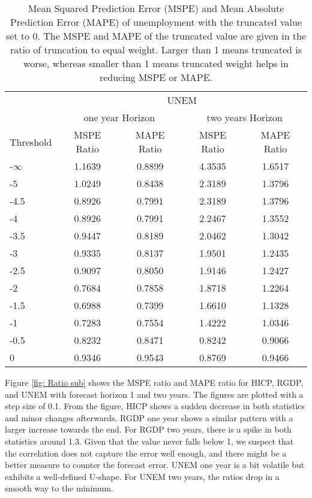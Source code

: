 \documentclass[11pt]{article}
\begin{document}
\begin{table}[!h] 
	\centering
	\caption{Mean Squared Prediction Error (MSPE) and Mean Absolute Prediction Error (MAPE) of unemployment with the truncated value set to 0. The MSPE and MAPE of the truncated value are given in the ratio of truncation to equal weight. Larger than 1 means truncated is worse, whereas smaller than 1 means truncated weight helps in reducing MSPE or MAPE.}
	\label{tab: MSPE UNEM}
	\begin{tabular}{lcccc}
		\hline\hline
		& \multicolumn{4}{c}{UNEM}                                                \\
		\cmidrule(lr){2-5}
		& \multicolumn{2}{c}{one year Horizon} & \multicolumn{2}{c}{two years Horizon} \\
		\cmidrule(lr){2-3} \cmidrule(lr){4-5}
		Threshold & MSPE Ratio &    MAPE Ratio    & MSPE Ratio &    MAPE Ratio    \\ 
		\hline
		-$\infty$ & 1.1639 & 0.8899 & 4.3535 & 1.6517\\ 
		-5 & 1.0249 & 0.8438 & 2.3189 & 1.3796\\ 
		-4.5 & 0.8926 & 0.7991 & 2.3189 & 1.3796\\ 
		-4 & 0.8926 & 0.7991 & 2.2467 & 1.3552\\ 
		-3.5 & 0.9447 & 0.8189 & 2.0462 & 1.3042\\ 
		-3 & 0.9335 & 0.8137 & 1.9501 & 1.2435\\ 
		-2.5 & 0.9097 & 0.8050 & 1.9146 & 1.2427\\ 
		-2 & 0.7684 & 0.7858 & 1.8718 & 1.2264\\ 
		-1.5 & 0.6988 & 0.7399 & 1.6610 & 1.1328\\ 
		-1 & 0.7283 & 0.7554 & 1.4222 & 1.0346\\ 
		-0.5 & 0.8232 & 0.8471 & 0.8242 & 0.9066\\ 
		0 & 0.9346 & 0.9543 & 0.8769 & 0.9466\\ \hline\hline
	\end{tabular}
\end{table}


Figure \ref{fig: Ratio sub} shows the MSPE ratio and MAPE ratio for HICP, RGDP, and UNEM with forecast horizon 1 and two years. The figures are plotted with a step size of 0.1. From the figure, HICP shows a sudden decrease in both statistics and minor changes afterwards. RGDP one year shows a similar pattern with a larger increase towards the end. For RGDP two years, there is a spike in both statistics around 1.3. Given that the value never falls below 1, we suspect that the correlation does not capture the error well enough, and there might be a better measure to counter the forecast error. UNEM one year is a bit volatile but exhibits a well-defined U-shape. For UNEM two years, the ratios drop in a smooth way to the minimum.
\end{document}
